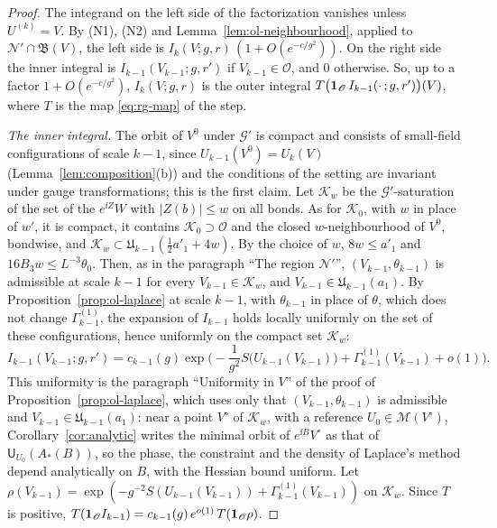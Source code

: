 \begin{proof}
The integrand on the left side of the factorization vanishes unless $U^{(k)}=V$. By (N1), (N2) and Lemma~\ref{lem:ol-neighbourhood}, applied to $\mathscr N'\cap\mathfrak B(V)$, the left side is $I_k(V;g,r)\,(1+O(e^{-c/g^2}))$. On the right side the inner integral is $I_{k-1}(V_{k-1};g,r')$ if $V_{k-1}\in\mathscr O$, and $0$ otherwise. So, up to a factor $1+O(e^{-c/g^2})$, $I_k(V;g,r)$ is the outer integral $T\big(\mathbf 1_{\mathscr O}\,I_{k-1}(\cdot\,;g,r')\big)(V)$, where $T$ is the map \eqref{eq:rg-map} of the step.

\emph{The inner integral.} The orbit of $V^0$ under $\mathcal G'$ is compact and consists of small-field configurations of scale $k-1$, since $U_{k-1}(V^0)=U_k(V)$ (Lemma~\ref{lem:composition}(b)) and the conditions of the setting are invariant under gauge transformations; this is the first claim. Let $\mathcal K_w$ be the $\mathcal G'$-saturation of the set of the $e^{\ii Z}W$ with $|Z(b)|\le w$ on all bonds. As for $\mathcal K_0$, with $w$ in place of $w'$, it is compact, it contains $\mathcal K_0\supset\mathscr O$ and the closed $w$-neighbourhood of $V^0$, bondwise, and $\mathcal K_w\subset\mathfrak U_{k-1}(\frac12a'_1+4w)$. By the choice of $w$, $8w\le a'_1$ and $16B_3w\le L^{-3}\theta_0$. Then, as in the paragraph ``The region $\mathscr N'$'', $(V_{k-1},\theta_{k-1})$ is admissible at scale $k-1$ for every $V_{k-1}\in\mathcal K_w$, and $V_{k-1}\in\mathfrak U_{k-1}(a_1)$. By Proposition~\ref{prop:ol-laplace} at scale $k-1$, with $\theta_{k-1}$ in place of $\theta$, which does not change $\Gamma^{(1)}_{k-1}$, the expansion of $I_{k-1}$ holds locally uniformly on the set of these configurations, hence uniformly on the compact set $\mathcal K_w$:
\[
I_{k-1}(V_{k-1};g,r')=c_{k-1}(g)\exp\Big(-\frac1{g^2}S\big(U_{k-1}(V_{k-1})\big)+\Gamma^{(1)}_{k-1}(V_{k-1})+o(1)\Big).
\]
This uniformity is the paragraph ``Uniformity in $V$'' of the proof of Proposition~\ref{prop:ol-laplace}, which uses only that $(V_{k-1},\theta_{k-1})$ is admissible and $V_{k-1}\in\mathfrak U_{k-1}(a_1)$: near a point $V^\circ$ of $\mathcal K_w$, with a reference $U_0\in\mathscr M(V^\circ)$, Corollary~\ref{cor:analytic} writes the minimal orbit of $e^{\ii B}V^\circ$ as that of $\mathsf U_{U_0}(A_*(B))$, so the phase, the constraint and the density of Laplace's method depend analytically on $B$, with the Hessian bound uniform. Let $\rho(V_{k-1})=\exp(-g^{-2}S(U_{k-1}(V_{k-1}))+\Gamma^{(1)}_{k-1}(V_{k-1}))$ on $\mathcal K_w$. Since $T$ is positive, $T(\mathbf 1_{\mathscr O}I_{k-1})=c_{k-1}(g)\,e^{o(1)}\,T(\mathbf 1_{\mathscr O}\rho)$.


\end{proof}
